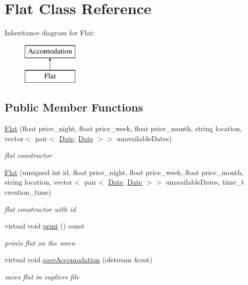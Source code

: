 \hypertarget{class_flat}{}\section{Flat Class Reference}
\label{class_flat}
Inheritance diagram for Flat\+:\begin{figure}[H]
\begin{center}
\leavevmode
\includegraphics[height=2.000000cm]{class_flat}
\end{center}
\end{figure}
\subsection*{Public Member Functions}
\begin{DoxyCompactItemize}
\item 
\hyperlink{class_flat_afa99056abbef313ebb20cdf4cc66bd14}{Flat} (float price\+\_\+night, float price\+\_\+week, float price\+\_\+month, string location, vector$<$ pair$<$ \hyperlink{class_date}{Date}, \hyperlink{class_date}{Date} $>$$>$ unavailable\+Dates)
\begin{DoxyCompactList}\small\item\em flat constructor \end{DoxyCompactList}\item 
\hyperlink{class_flat_a62692affe2927b8ff4f80b9d04c43732}{Flat} (unsigned int id, float price\+\_\+night, float price\+\_\+week, float price\+\_\+month, string location, vector$<$ pair$<$ \hyperlink{class_date}{Date}, \hyperlink{class_date}{Date} $>$$>$ unavailable\+Dates, time\+\_\+t creation\+\_\+time)
\begin{DoxyCompactList}\small\item\em flat constructor with id \end{DoxyCompactList}\item 
\hypertarget{class_flat_a9ba466cf178ef918f571145838d81173}{}\label{class_flat_a9ba466cf178ef918f571145838d81173} 
virtual void \hyperlink{class_flat_a9ba466cf178ef918f571145838d81173}{print} () const
\begin{DoxyCompactList}\small\item\em prints flat on the sreen \end{DoxyCompactList}\item 
virtual void \hyperlink{class_flat_a9569fe297d02edebfe67d62125a86696}{save\+Accomodation} (ofstream \&out)
\begin{DoxyCompactList}\small\item\em saves flat in supliers file \end{DoxyCompactList}\end{DoxyCompactItemize}
